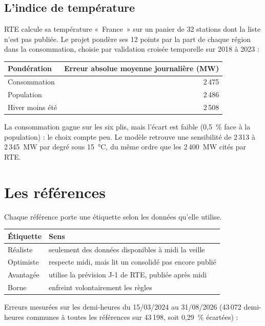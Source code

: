 \documentclass[11pt,a4paper]{article}
\begin{document}
\subsection{L'indice de température}

RTE calcule sa température «~France~» sur un panier de 32 stations dont la liste n'est pas publiée. Le projet pondère ses 12 points par la part de chaque région dans la consommation, choisie par validation croisée temporelle sur 2018 à 2023 :

\begin{table}[H]
\small
\begin{tabularx}{\linewidth}{Yr}
\toprule
\textbf{Pondération} & \textbf{Erreur absolue moyenne journalière (MW)} \\
\midrule
Consommation & 2\,475 \\
Population & 2\,486 \\
Hiver moins été & 2\,508 \\
\bottomrule
\end{tabularx}
\end{table}

La consommation gagne sur les six plis, mais l'écart est faible (0,5~\% face à la population) : le choix compte peu. Le modèle retrouve une sensibilité de 2\,313 à 2\,345~MW par degré sous 15~°C, du même ordre que les 2\,400~MW cités par RTE.

\section{Les références}

Chaque référence porte une étiquette selon les données qu'elle utilise.

\begin{table}[H]
\small
\begin{tabularx}{\linewidth}{lY}
\toprule
\textbf{Étiquette} & \textbf{Sens} \\
\midrule
Réaliste & seulement des données disponibles à midi la veille \\
Optimiste & respecte midi, mais lit un consolidé pas encore publié \\
Avantagée & utilise la prévision J-1 de RTE, publiée après midi \\
Borne & enfreint volontairement les règles \\
\bottomrule
\end{tabularx}
\end{table}

Erreurs mesurées sur les demi-heures du 15/03/2024 au 31/08/2026 (43\,072 demi-heures communes à toutes les références sur 43\,198, soit 0,29~\% écartées) :
\end{document}
